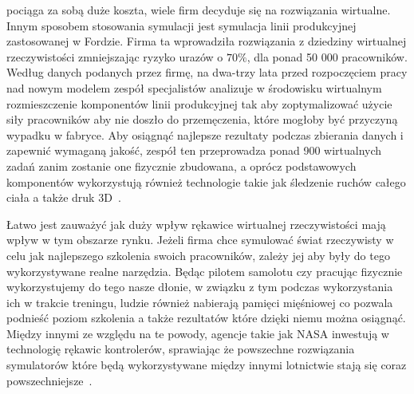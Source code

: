 pociąga za sobą duże koszta, wiele firm decyduje się na rozwiązania wirtualne. Innym sposobem stosowania symulacji jest symulacja linii produkcyjnej zastosowanej w Fordzie. Firma ta wprowadziła rozwiązania z dziedziny wirtualnej rzeczywistości zmniejszając ryzyko urazów o $70\%$, dla ponad 50 000 pracowników. Według danych podanych przez firmę, na dwa-trzy lata przed rozpoczęciem pracy nad nowym modelem zespół specjalistów analizuje w środowisku wirtualnym rozmieszczenie komponentów linii produkcyjnej tak aby zoptymalizować użycie siły pracowników aby nie doszło do przemęczenia, które mogłoby być przyczyną wypadku w fabryce. Aby osiągnąć najlepsze rezultaty podczas zbierania danych i zapewnić wymaganą jakość, zespół ten przeprowadza ponad 900 wirtualnych zadań zanim zostanie one fizycznie zbudowana, a oprócz podstawowych komponentów wykorzystują również technologie takie jak śledzenie ruchów całego ciała a także druk 3D~\cite{ford1}.
 
 Łatwo jest zauważyć jak duży wpływ rękawice wirtualnej rzeczywistości mają wpływ w tym obszarze rynku. Jeżeli firma chce symulować świat rzeczywisty w celu jak najlepszego szkolenia swoich pracowników, zależy jej aby były do tego wykorzystywane realne narzędzia. Będąc pilotem samolotu czy pracując fizycznie wykorzystujemy do tego nasze dłonie, w związku z tym podczas wykorzystania ich w trakcie treningu, ludzie również nabierają pamięci mięśniowej co pozwala podnieść poziom szkolenia a także rezultatów które dzięki niemu można osiągnąć. Między innymi ze względu na te powody, agencje takie jak NASA inwestują w technologię rękawic kontrolerów, sprawiając że powszechne rozwiązania symulatorów które będą wykorzystywane między innymi lotnictwie stają się coraz powszechniejsze~\cite{manus}. 
 
